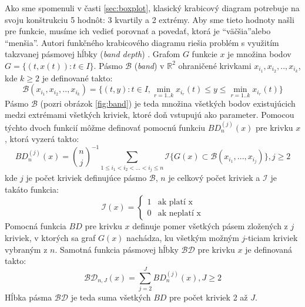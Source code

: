 Ako sme spomenuli v časti \ref{sec:boxplot}, klasický krabicový diagram potrebuje na svoju konštrukciu 5 hodnôt: 3 kvartily a 2 extrémy. Aby sme tieto hodnoty našli pre funkcie, musíme ich vedieť porovnať a povedať, ktorá je \textquotedblleft väčšia\textquotedblright alebo \textquotedblleft menšia\textquotedblright. Autori funkčného krabicového diagramu riešia problém s využitím takzvanej pásmovej hĺbky (\textit{band depth}) \cite{BandDepth}. Grafom $ G $ funkcie $ x $ je množina bodov $ G = \{ (t,x(t)) : t \in I \} $. Pásmo $ \mathcal{B} $ (\textit{band}) v $ \mathbb{R}^{2}  $ ohraničené krivkami $ x_{i_{1}}, x_{i_{2}}, .. , x_{i_{k}} $, kde $ k \geq 2 $ je definované takto:
\[
	\mathcal{B}(x_{i_{1}}, x_{i_{2}}, .. , x_{i_{k}}) = \{ (t,y) : t \in I, \min_{r=1..k}x_{i_{r}}(t) \leq y \leq \min_{r=1..k}x_{i_{r}}(t) \}
\]
Pásmo $ \mathcal{B} $ (pozri obrázok \ref{fig:band}) je teda množina všetkých bodov existujúcich medzi extrémami všetkých kriviek, ktoré doň vstupujú ako parameter. 
Pomocou týchto dvoch funkcií môžme definovať pomocnú funkciu $ BD_{n}^{(j)}(x) $ pre krivku $ x $, ktorá vyzerá takto:
\[
	BD^{(j)}_{n}(x) = {n \choose j}^{-1} \sum_{1 \leq i_{1} < i_{2} < ... < i_{j} \leq n} \mathcal{I}\{ G(x) \subset \mathcal{B}(x_{i_{1}}, ... ,x_{i_{j}}) \}, j \geq 2
\]
kde $ j $ je počet kriviek definujúce pásmo $ \mathcal{B} $, $ n $ je celkový počet kriviek a $ \mathcal{I} $ je takáto funkcia:
\[
	\mathcal{I}(x) = \left\{
	\begin{array}{ll}
	1 & \mbox{ak platí x}  \\
	0 & \mbox{ak neplatí x} 
	\end{array}
	\right.
\]
Pomocná funkcia $ BD $ pre krivku $ x $ definuje pomer všetkých pásem zložených z $ j $ kriviek, v ktorých sa graf $ G(x) $ nachádza, ku všetkým možným $ j $-ticiam kriviek vybraným z $ n $. 
Samotná funkcia pásmovej hĺbky $ \mathcal{BD} $ pre krivku $ x $ je definovaná takto:
\[
	\mathcal{BD}_{n, J}(x) = \sum_{j = 2}^{J} BD^{(j)}_{n}(x), J \geq 2
\]
Hĺbka pásma $ \mathcal{BD} $ je teda suma všetkých $ BD $ pre počet kriviek 2 až $ J $.

